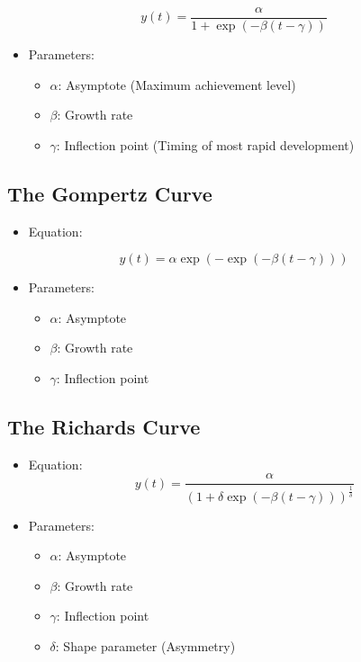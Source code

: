 \documentclass[
  letterpaper,
  DIV=11,
  numbers=noendperiod]{scrreprt}
\providecommand{\tightlist}{%
  \setlength{\itemsep}{0pt}\setlength{\parskip}{0pt}}\usepackage{longtable,booktabs,array}
\begin{document}
\[
y(t) = \frac{\alpha}{1 + \exp(-\beta (t - \gamma))}
\]

\begin{itemize}
\tightlist
\item
  Parameters:

  \begin{itemize}
  \tightlist
  \item
    \(\alpha\): Asymptote (Maximum achievement level)\\
  \item
    \(\beta\): Growth rate
  \item
    \(\gamma\): Inflection point (Timing of most rapid development)
  \end{itemize}
\end{itemize}

\subsection{The Gompertz Curve}\label{the-gompertz-curve}

\begin{itemize}
\tightlist
\item
  Equation:
\end{itemize}

\[
y(t) = \alpha \exp(-\exp(-\beta (t - \gamma)))
\]

\begin{itemize}
\tightlist
\item
  Parameters:

  \begin{itemize}
  \tightlist
  \item
    \(\alpha\): Asymptote
  \item
    \(\beta\): Growth rate
  \item
    \(\gamma\): Inflection point
  \end{itemize}
\end{itemize}

\subsection{The Richards Curve}\label{the-richards-curve}

\begin{itemize}
\item
  Equation: \[
  y(t) = \frac{\alpha}{(1 + \delta \exp(-\beta (t - \gamma)))^{\frac{1}{\delta}}}
  \]
\item
  Parameters:

  \begin{itemize}
  \tightlist
  \item
    \(\alpha\): Asymptote
  \item
    \(\beta\): Growth rate
  \item
    \(\gamma\): Inflection point
  \item
    \(\delta\): Shape parameter (Asymmetry)
  \end{itemize}
\end{itemize}
\end{document}
